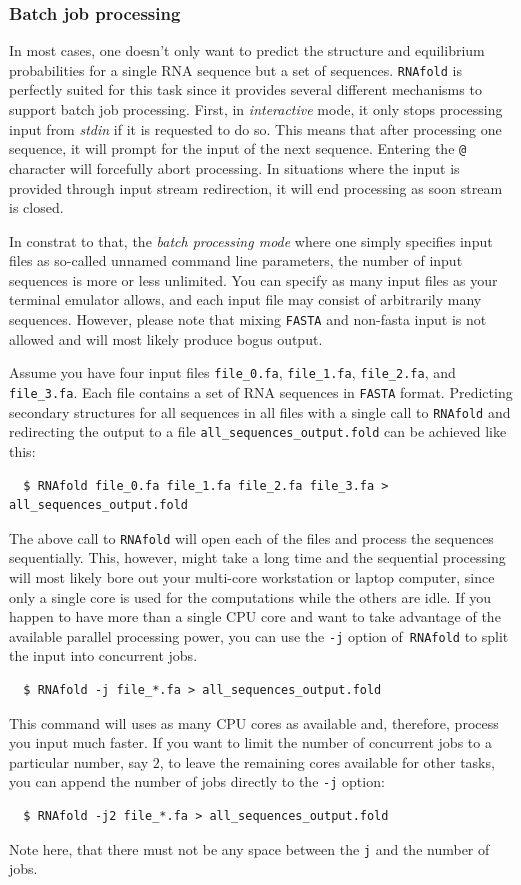 \documentclass[a4paper]{article}
\begin{document}
\subsubsection{Batch job processing}
In most cases, one doesn't only want to predict the structure and equilibrium
probabilities for a single RNA sequence but a set of sequences. \texttt{RNAfold}
is perfectly suited for this task since it provides several different mechanisms
to support batch job processing. First, in \textit{interactive} mode, it only
stops processing input from \textit{stdin} if it is requested to do so. This means
that after processing one sequence, it will prompt for the input of the next
sequence. Entering the \texttt{@} character will forcefully abort processing.
In situations where the input is provided through input stream redirection,
it will end processing as soon stream is closed.

In constrat to that, the \textit{batch processing mode} where one simply specifies
input files as so-called unnamed command line parameters, the number of input
sequences is more or less unlimited. You can specify as many input files as
your terminal emulator allows, and each input file may consist of arbitrarily
many sequences. However, please note that mixing \texttt{FASTA} and non-fasta
input is not allowed and will most likely produce bogus output.

Assume you have four input files \texttt{file\_0.fa}, \texttt{file\_1.fa},
\texttt{file\_2.fa}, and \texttt{file\_3.fa}. Each file contains a set of RNA
sequences in \texttt{FASTA} format. Predicting secondary structures for all
sequences in all files with a single call to \texttt{RNAfold} and redirecting
the output to a file \texttt{all\_sequences\_output.fold} can be achieved
like this:
\begin{verbatim}
  $ RNAfold file_0.fa file_1.fa file_2.fa file_3.fa > all_sequences_output.fold
\end{verbatim}

The above call to \texttt{RNAfold} will open each of the files and process the
sequences sequentially. This, however, might take a long time and the sequential
processing will most likely bore out your multi-core workstation or laptop computer,
since only a single core is used for the computations while the others are idle.
If you happen to have more than a single CPU core and want to take advantage of
the available parallel processing power, you can use the \texttt{-j} option of\
\texttt{RNAfold} to split the input into concurrent jobs.
\begin{verbatim}
  $ RNAfold -j file_*.fa > all_sequences_output.fold
\end{verbatim}
This command will uses as many CPU cores as available and, therefore, process
you input much faster. If you want to limit the number of concurrent jobs to
a particular number, say $2$, to leave the remaining cores available for other
tasks, you can append the number of jobs directly to the \texttt{-j} option:
\begin{verbatim}
  $ RNAfold -j2 file_*.fa > all_sequences_output.fold
\end{verbatim}
Note here, that there must not be any space between the \texttt{j} and the number
of jobs.
\end{document}
